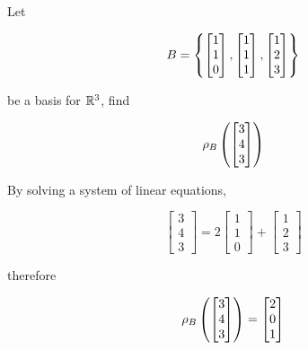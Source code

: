 \documentclass[a4paper,12pt]{article}
\begin{document}
\begin{exm}
  Let
  
  $$B=\left\{ \begin{bmatrix}
    1\\
    1\\
    0
  \end{bmatrix},\begin{bmatrix}
    1\\
    1\\
    1
  \end{bmatrix},\begin{bmatrix}
    1\\
    2\\
    3
  \end{bmatrix}\right\}$$\s

  be a basis for $\mathbb{R}^{3}$, find

  $$\rho_{B}\left( \begin{bmatrix}
    3\\
    4\\
    3
  \end{bmatrix}\right)$$\s

  \ans By solving a system of linear equations,

  $$\begin{bmatrix}
    3\\
    4\\
    3
  \end{bmatrix}=2\begin{bmatrix}
    1\\
    1\\
    0
  \end{bmatrix}+\begin{bmatrix}
    1\\
    2\\
    3
  \end{bmatrix}$$\s

  therefore

  $$\rho_{B}\left( \begin{bmatrix}
    3\\
    4\\
    3
  \end{bmatrix}\right)=\begin{bmatrix}
    2\\
    0\\
    1
  \end{bmatrix}$$
\end{exm}
\end{document}
